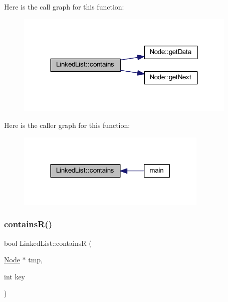 Here is the call graph for this function\+:
\nopagebreak
\begin{figure}[H]
\begin{center}
\leavevmode
\includegraphics[width=299pt]{class_linked_list_ac2fac6f86f1891576b57c2866ff77803_cgraph}
\end{center}
\end{figure}
Here is the caller graph for this function\+:
\nopagebreak
\begin{figure}[H]
\begin{center}
\leavevmode
\includegraphics[width=258pt]{class_linked_list_ac2fac6f86f1891576b57c2866ff77803_icgraph}
\end{center}
\end{figure}
\mbox{\label{class_linked_list_a67c86ff482738c1ab36bb8c764a7f3f7}} 
\subsubsection{\texorpdfstring{contains\+R()}{containsR()}}
{\footnotesize\ttfamily bool Linked\+List\+::containsR (\begin{DoxyParamCaption}\item[{\hyperlink{class_node}{Node} $\ast$}]{tmp,  }\item[{int}]{key }\end{DoxyParamCaption})}

